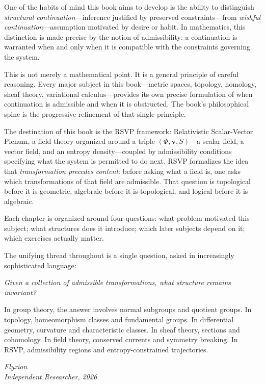\documentclass[12pt, twoside, openright, a4paper]{book}
\begin{document}
One of the habits of mind this book aims to develop is the ability to distinguish \emph{structural continuation}---inference justified by preserved constraints---from \emph{wishful continuation}---assumption motivated by desire or habit. In mathematics, this distinction is made precise by the notion of admissibility: a continuation is warranted when and only when it is compatible with the constraints governing the system.

This is not merely a mathematical point. It is a general principle of careful reasoning. Every major subject in this book---metric spaces, topology, homology, sheaf theory, variational calculus---provides its own precise formulation of when continuation is admissible and when it is obstructed. The book's philosophical spine is the progressive refinement of that single principle.

The destination of this book is the RSVP framework: Relativistic Scalar-Vector Plenum, a field theory organized around a triple $(\Phi, \mathbf{v}, S)$---a scalar field, a vector field, and an entropy density---coupled by admissibility conditions specifying what the system is permitted to do next.
RSVP formalizes the idea that \emph{transformation precedes content}: before asking what a field is, one asks which transformations of that field are admissible.
That question is topological before it is geometric, algebraic before it is topological, and logical before it is algebraic.

Each chapter is organized around four questions: what problem motivated this subject; what structures does it introduce; which later subjects depend on it; which exercises actually matter.

The unifying thread throughout is a single question, asked in increasingly sophisticated language:

\begin{center}
\itshape
Given a collection of admissible transformations, what structure remains invariant?
\end{center}

In group theory, the answer involves normal subgroups and quotient groups.
In topology, homeomorphism classes and fundamental groups.
In differential geometry, curvature and characteristic classes.
In sheaf theory, sections and cohomology.
In field theory, conserved currents and symmetry breaking.
In RSVP, admissibility regions and entropy-constrained trajectories.

\bigskip\noindent\textit{Flyxion}\\
\textit{Independent Researcher, 2026}
\end{document}
